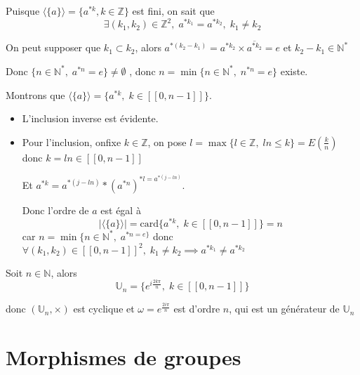 \begin{myproof}{}{}
  Puisque $\langle \{a\} \rangle = \{ a ^{*k}, k \in \mathbb{Z} \}$  est fini, on sait que 
  \begin{equation}
    \exists (k_1, k_2) \in \mathbb{Z} ^{2}, \; a ^{* k_1} = a ^{*k_2}, \; k_1 \ne k_2
  \end{equation}

  On peut supposer que $k_1 \subset k_2$, alors $a ^{*(k_2 -k_1)} = a ^{*k_2} \times \overline{a ^{*k_2}} = e$ et $k_2 - k_1 \in \mathbb{N} ^{*}$

  Donc $\{ n\in \mathbb{N} ^{*}, \; a ^{*n} = e\} \ne \emptyset$ , donc $n = \min\{ n \in \mathbb{N} ^{*}, \; n ^{*n} = e\}$ existe.

  Montrons que $\langle \{ a\} \rangle = \{a ^{*k}, \; k \in [\![0, n-1]\!]\}$. 

  \begin{itemize}

      \item  L'inclusion inverse est évidente. 
      \item Pour l'inclusion, onfixe $k \in \mathbb{Z}$, on pose $l = \max \{l \in \mathbb{Z}, \; l n \le k \} = E \left( \frac{k}{n}  \right)$ donc $k = l n \in [\![0, n-1]\!]$

        Et $a ^{*k} = a ^{*(j-ln)} * (a ^{*n}) ^{*l = a ^{*(j- l n)}}$. 

        Donc l'ordre de $a$ est égal à 
        \begin{equation}
          | \langle \{a\} \rangle | = \mathrm{card} \{ a ^{*k},\; k \in [\![0, n-1]\!]\} = n
        \end{equation}
        car $n = \min \{n \in \mathbb{N} ^{*}, \; a ^{*n = e\}}$ donc $\forall (k_1, k_2) \in [\![0, n-1]\!] ^{2}, \; k_1 \ne k_2 \implies a ^{*k_1} \ne a ^{*k_2}$
  \end{itemize}
\end{myproof}


\begin{Example}{}{}
Soit $n \in \mathbb{N}$, alors 
\begin{equation}
  \mathbb{U}_n = \{ e ^{i \frac{2k \pi}{n} }, \; k \in [\![0, n-1]\!]\}
\end{equation}

donc $(\mathbb{U}_n , \times)$ est cyclique et $\omega = e ^{\frac{2i \pi}{n} }$ est d'ordre $n$, qui est un générateur de $\mathbb{U}_n$
\end{Example}

\section{Morphismes de groupes} %
\label{sec:Morphismes de groupes}


